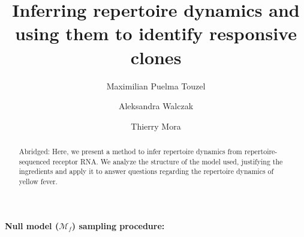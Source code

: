\documentclass[letterpaper,english,prl,reprint,onecolumn,longbibliography]{revtex4-1} %
\begin{document}

\title{Inferring repertoire dynamics and using them to identify responsive clones}

\author{Maximilian Puelma Touzel}


\author{Aleksandra Walczak}


\author{Thierry Mora}


\vspace{0.5cm}


\begin{abstract}
Abridged: Here, we present a method to infer repertoire dynamics from repertoire-sequenced receptor RNA. We analyze the structure of the model used, justifying the ingredients and apply it to answer questions regarding the repertoire dynamics of yellow fever.



\end{abstract}


\pacs{}

\maketitle

\textbf{Null model ($\mathcal{M}_f$) sampling procedure:}
\end{document}
